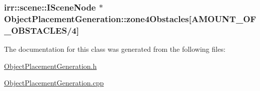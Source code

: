 \hypertarget{class_object_placement_generation_a224b6935021f0cad3bb6d38f60ce0800}{
\subsubsection[{zone4\-Obstacles}]{\setlength{\rightskip}{0pt plus 5cm}irr\-::scene\-::\-I\-Scene\-Node $\ast$ Object\-Placement\-Generation\-::zone4\-Obstacles\mbox{[}{\bf A\-M\-O\-U\-N\-T\-\_\-\-O\-F\-\_\-\-O\-B\-S\-T\-A\-C\-L\-E\-S}/4\mbox{]}\hspace{0.3cm}{\ttfamily [private]}}}\label{class_object_placement_generation_a224b6935021f0cad3bb6d38f60ce0800}


The documentation for this class was generated from the following files\-:\begin{DoxyCompactItemize}
\item 
\hyperlink{_object_placement_generation_8h}{Object\-Placement\-Generation.\-h}\item 
\hyperlink{_object_placement_generation_8cpp}{Object\-Placement\-Generation.\-cpp}\end{DoxyCompactItemize}
